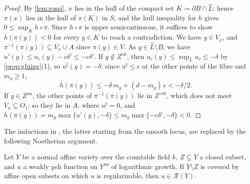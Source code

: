 \documentclass[11pt,a4paper]{article}
\newcommand{\an}{\mathrm{an}}          %
\begin{document}
\begin{proof}
By \cref{lem:rossi}, $x$ lies in the hull of the compact set $K\coloneqq\partial B\cap\widehat L$; hence $\pi(x)$ lies in the hull of $\pi(K)$ in $S$, and the hull inequality for $h$ gives $0\le\sup_Kh\circ\pi$. Since $h\circ\pi$ is upper semicontinuous, it suffices to show $h(\pi(y))<0$ for every $y\in K$ to reach a contradiction. We have $y\in V_x$, and $\pi^{-1}(\pi(y))\subseteq V_x\cup A$ since $\pi(y)\in V$. As $y\in\widehat L\setminus B$, we have $u'(y)\le u_c(y)-c\delta'\le-c\delta'$. If $y\notin Z^{\an}$, then $u_c(y)\le\sup_Lu_c\le-\delta$ by \cref{prop:gluing}(1), so $u^\sharp(y)=-\delta$; since $u^\sharp\le\epsilon$ at the other points of the fibre and $m_y\ge1$,
\[
h(\pi(y))\le-\delta\,m_y+(d-m_y)\,\epsilon<-\delta/2 .
\]
If $y\in Z^{\an}$, the other points of $\pi^{-1}(\pi(y))$ lie in $Z'^{\an}$, which does not meet $V_x\subseteq O_1$; so they lie in $A$, where $u^\sharp=0$, and $h(\pi(y))=m_y\max\{u'(y),-\delta\}\le m_y\max\{-c\delta',-\delta\}<0$.
\end{proof}

The inductions in \cite[Proposition~6.14 and Theorem~6.3]{Wu26}, the latter starting from the smooth locus, are replaced by the following Noetherian argument.

\begin{theorem}\label{thm:normal-local-regularization}
Let $Y$ be a normal affine variety over the countable field $k$, $Z\subsetneq Y$ a closed subset, and $u$ a weakly psh function on $Y^{\an}$ of logarithmic growth. If $Y\setminus Z$ is covered by affine open subsets on which $u$ is regularizable, then $u\in\mathcal{R}(Y)$.
\end{theorem}
\end{document}
